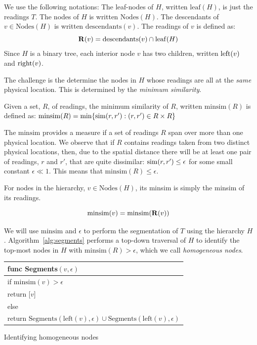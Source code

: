 We use the following notations:
The leaf-nodes of $H$, written $\mathrm{leaf}(H)$, is just the readings $T$.  The nodes of $H$ is written $\mathrm{Nodes}(H)$.  The descendants of $v\in \mathrm{Nodes}(H)$ is written $\mathrm{descendants}(v)$.  The readings of $v$ is defined as: $$\mathbf{R}(v) = \mathrm{descendants}(v)\cap\mathrm{leaf}(H)$$
Since $H$ is a binary tree, each interior node $v$ has two children, written $\mathrm{left}(v)$ and $\mathrm{right}(v)$.

The challenge is the determine the nodes in $H$ whose readings are all at the
{\em same} physical location.  This is determined by the {\em minimum
similarity}.

\begin{definition}
    Given a set, $R$, of readings, the minimum similarity of $R$, written
    $\mathrm{minsim}(R)$ is defined as:
    $\mathrm{minsim}(R) = \min\{\mathrm{sim}(r,r'): (r,r')\in R\times R\}$
    \label{def:minsim}
\end{definition}

The $\mathrm{minsim}$ provides a measure if a set of readings $R$ span over more
than one physical location.
We observe that if $R$ contains readings taken from two distinct physical
locations, then, due to the spatial distance there will be at least one pair of
readings, $r$ and $r'$, that are quite dissimilar: $\mathrm{sim}(r, r') \leq \epsilon$ for some
small constant $\epsilon\ll 1$.  This means that $\mathrm{minsim}(R)\leq \epsilon$.

For nodes in the hierarchy, $v\in\mathrm{Nodes}(H)$, its minsim is simply the
minsim of its readings.

\begin{definition}
    $$\mathrm{minsim}(v) = \mathrm{minsim}(\mathbf{R}(v))$$
\end{definition}

We will use $\mathrm{minsim}$ and $\epsilon$ to perform the segmentation of $T$
using the hierarchy $H$.  Algorithm~\ref{alg:segments} performs a top-down
traversal of $H$ to identify the top-most nodes in $H$ with 
$\mathrm{minsim}(R) > \epsilon$, which we call {\em homogeneous nodes}.

\begin{algorithm}[t]
    \centering
    \begin{tabular}{|l|}\hline
        func Segments$(v, \epsilon)$ \\ \hline
        if $\mathrm{minsim}(v) > \epsilon$ \\
        \RRR return [$v$] \\
        else \\
        \RRR return $\mathrm{Segments}(\mathrm{left}(v), \epsilon) \cup
                      \mathrm{Segments}(\mathrm{left}(v), \epsilon)$ \\ \hline
    \end{tabular}
    \vspace{0.4cm}
    \caption{Identifying homogeneous nodes}
    \label{alg:segments}
\end{algorithm}

